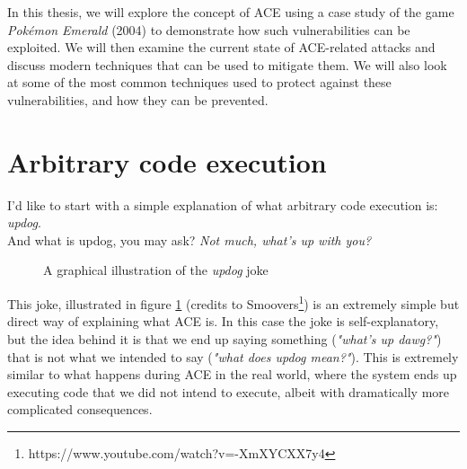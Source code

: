 \documentclass[a4paper]{usiinfbachelorproject}
\begin{document}
In this thesis, we will explore the concept of ACE using a case study of the game \textit{Pokémon Emerald} (2004) to demonstrate how such vulnerabilities can be exploited. We will then examine the current state of ACE-related attacks and discuss modern techniques that can be used to mitigate them. We will also look at some of the most common techniques used to protect against these vulnerabilities, and how they can be prevented.

\section{Arbitrary code execution}
\label{sec:ace}
I'd like to start with a simple explanation of what arbitrary code execution is: \textit{updog}. \\ And what is updog, you may ask? \textit{Not much, what's up with you?}

\begin{figure}[h!]
	\caption{A graphical illustration of the \textit{updog} joke\label{fig:updog}}
\end{figure}

This joke, illustrated in figure \ref{fig:updog} (credits to Smoovers\footnote{https://www.youtube.com/watch?v=-XmXYCXX7y4}) is an extremely simple but direct way of explaining what ACE is. In this case the joke is self-explanatory, but the idea behind it is that we end up saying something (\textit{"what's up dawg?"}) that is not what we intended to say (\textit{"what does updog mean?"}). This is extremely similar to what happens during ACE in the real world, where the system ends up executing code that we did not intend to execute, albeit with dramatically more complicated consequences.
\end{document}

